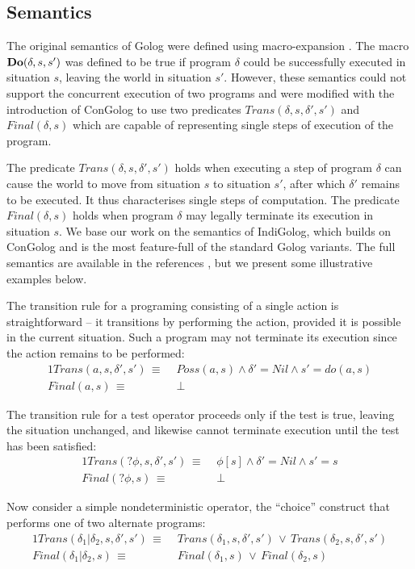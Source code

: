\subsection{Semantics}

The original semantics of Golog were defined using macro-expansion
\citep{levesque97golog}. The macro $\mathbf{Do}(\delta,s,s')$ was defined
to be true if program $\delta$ could be successfully executed in
situation $s$, leaving the world in situation $s'$. However, these
semantics could not support the concurrent execution of two programs
and were modified with the introduction of ConGolog \citep{giacomo00congolog}
to use two predicates $Trans(\delta,s,\delta',s')$ and $Final(\delta,s)$
which are capable of representing single steps of execution of the
program.

The predicate $Trans(\delta,s,\delta',s')$ holds when executing a
step of program $\delta$ can cause the world to move from situation
$s$ to situation $s'$, after which $\delta'$ remains to be executed.
It thus characterises single steps of computation. The predicate $Final(\delta,s)$
holds when program $\delta$ may legally terminate its execution in
situation $s$. We base our work on the semantics of IndiGolog, which
builds on ConGolog and is the most feature-full of the standard Golog
variants. The full semantics are available in the references \citep{giacomo00congolog,giacomo99indigolog},
but we present some illustrative examples below.

The transition rule for a programing consisting of a single action
is straightforward -- it transitions by performing the action, provided
it is possible in the current situation. Such a program may not terminate
its execution since the action remains to be performed:\begin{alignat*}{1}
Trans(a,s,\delta',s')\,\equiv\, & \, Poss(a,s)\wedge\delta'=Nil\wedge s'=do(a,s)\\
Final(a,s)\,\equiv\, & \,\bot\end{alignat*}


The transition rule for a test operator proceeds only if the test
is true, leaving the situation unchanged, and likewise cannot terminate
execution until the test has been satisfied:\begin{alignat*}{1}
Trans(?\phi,s,\delta',s')\,\equiv\, & \,\phi[s]\wedge\delta'=Nil\wedge s'=s\\
Final(?\phi,s)\,\equiv\, & \,\bot\end{alignat*}


Now consider a simple nondeterministic operator, the {}``choice''
construct that performs one of two alternate programs:\begin{alignat*}{1}
Trans(\delta_{1}|\delta_{2},s,\delta',s')\,\equiv\, & \, Trans(\delta_{1},s,\delta',s')\,\vee\, Trans(\delta_{2},s,\delta',s')\\
Final(\delta_{1}|\delta_{2},s)\,\equiv\, & \, Final(\delta_{1},s)\,\vee\, Final(\delta_{2},s)\end{alignat*}



